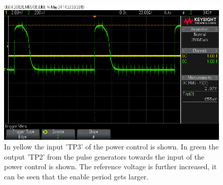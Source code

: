 \begin{figure}[H]
\centering
\includegraphics[width=.9\textwidth]{figures/scope_18.png}
\caption{In yellow the input 'TP3' of the power control is shown. In green the output 'TP2' from the pulse generators towards the input of the power control is shown. The reference voltage is further increased, it can be seen that the enable period gets larger.}
\label{fig:scope_18}
\end{figure}

